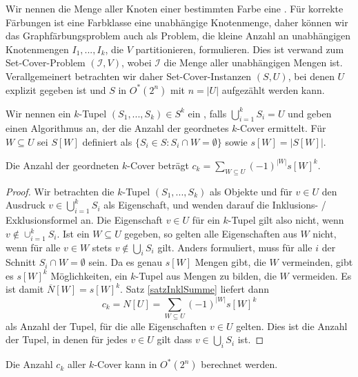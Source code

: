   Wir nennen die Menge aller Knoten einer bestimmten Farbe eine . Für korrekte Färbungen ist eine Farbklasse eine unabhängige Knotenmenge, daher können wir das Graphfärbungsproblem auch als Problem, die kleine Anzahl an unabhängigen Knotenmengen \(I_1,...,I_k\), die \(V\) partitionieren, formulieren. Dies ist verwand zum Set-Cover-Problem \( (\mathcal{I}, V) \), wobei \(\mathcal{I}\) die Menge aller unabhängigen Mengen ist. Verallgemeinert betrachten wir daher Set-Cover-Instanzen \( (S,U) \), bei denen \(U\) explizit gegeben ist und \(S\) in \(O^*(2^n)\) mit \(n = |U|\) aufgezählt werden kann. 
  
  Wir nennen ein \(k\)-Tupel \( (S_1, ..., S_k) \in S^k\) ein , falls \( \bigcup_{i=1}^k S_i = U \) und geben einen Algorithmus an, der die Anzahl der geordnetes \(k\)-Cover ermittelt. Für \(W \subseteq U\) sei \(S[W]\) definiert als \( \{ S_i \in S : S_i \cap W = \emptyset \} \) sowie \(s[W] = |S[W]|\).
  
  \begin{lemma}
   Die Anzahl der geordneten \(k\)-Cover beträgt \(c_k = \sum_{W \subseteq U} (-1)^{ |W| } s[W]^k\).
  \end{lemma}

  
  \begin{proof}
    Wir betrachten die \(k\)-Tupel \( (S_1, ..., S_k) \) als Objekte und für \(v \in U\) den Ausdruck \(v \in \bigcup_{i=1}^k S_i\) als Eigenschaft, und wenden darauf die Inklusions- / Exklusionsformel an. Die Eigenschaft \(v \in U\) für ein \(k\)-Tupel gilt also nicht, wenn \(v \notin \cup_{i=1}^k S_i\). Ist ein \(W \subseteq U\) gegeben, so gelten alle Eigenschaften aus \(W\) nicht, wenn für alle \(v \in W\) stets \(v \notin \bigcup_i S_i\) gilt. Anders formuliert, muss für alle \(i\) der Schnitt \(S_i \cap W = \emptyset\) sein. Da es genau \(s[W]\) Mengen gibt, die \(W\) vermeinden, gibt es \(s[W]^k\) Möglichkeiten, ein \(k\)-Tupel aus Mengen zu bilden, die \(W\) vermeiden. Es ist damit \( \overline{N}[W] = s[W]^k\). Satz \ref{satzInklSumme} liefert dann \[c_k = N[U] = \sum_{W \subseteq U} (-1)^{ |W| } s[W]^k\] als Anzahl der Tupel, für die alle Eigenschaften \(v \in U\) gelten. Dies ist die Anzahl der Tupel, in denen für jedes \(v \in U\) gilt dass \(v \in \bigcup_i S_i\) ist.
  \end{proof}

  \begin{theorem}
    Die Anzahl \(c_k\) aller \(k\)-Cover kann in \(O^*(2^n)\) berechnet werden.
  \end{theorem}

